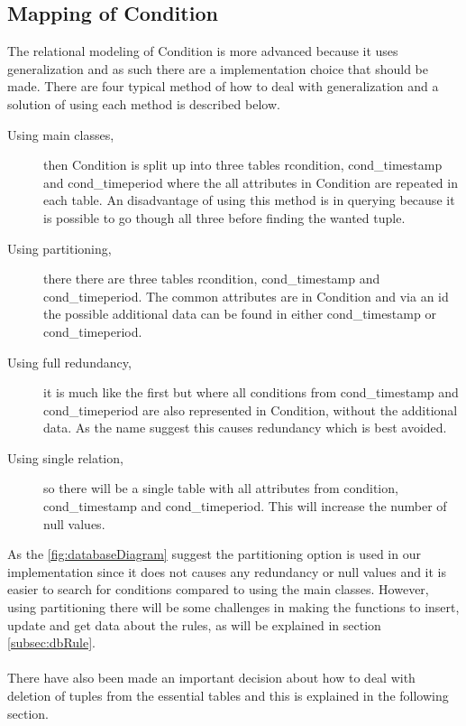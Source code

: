 \subsection{Mapping of Condition}
\label{subsec:mappRule}
The relational modeling of Condition is more advanced because it uses generalization and as such there are a implementation choice that should be made. There are four typical method of how to deal with generalization and a solution of using each method is described below.

\begin{description}
	\item[Using main classes,] then Condition is split up into three tables rcondition, cond\_timestamp and cond\_timeperiod where the all attributes in Condition are repeated in each table. An disadvantage of using this method is in querying because it is possible to go though all three before finding the wanted tuple.
	\item[Using partitioning,] there there are three tables rcondition, cond\_timestamp and cond\_timeperiod. The common attributes are in Condition and via an id the possible additional data can be found in either cond\_timestamp or cond\_timeperiod.
	\item[Using full redundancy,] it is much like the first but where all conditions from cond\_timestamp and cond\_timeperiod are also represented in Condition, without the additional data. As the name suggest this causes redundancy which is best avoided.
	\item[Using single relation,] so there will be a single table with all attributes from condition, cond\_timestamp and cond\_timeperiod. This will increase the number of null values. 
\end{description}

As the \ref{fig:databaseDiagram} suggest the partitioning option is used in our implementation since it does not causes any redundancy or null values and it is easier to search for conditions compared to using the main classes. However, using partitioning there will be some challenges in making the functions to insert, update and get data about the rules, as will be explained in section \vref{subsec:dbRule}.\\\\


There have also been made an important decision about how to deal with deletion of tuples from the essential tables and this is explained in the following section.
 
